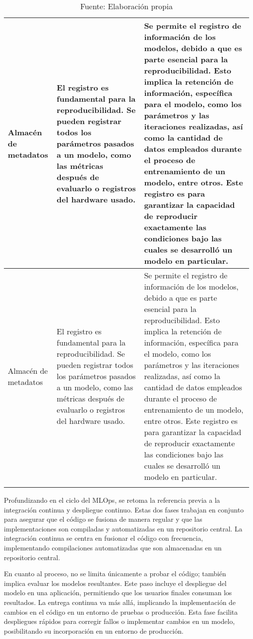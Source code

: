 \begin{longtable}{|p{3cm}|p{5cm}|p{6cm}|}
        \hline
        Almacén de metadatos & El registro es fundamental para la reproducibilidad. Se pueden registrar todos los parámetros pasados a un modelo, como las métricas después de evaluarlo o registros del hardware usado. & Se permite el registro de información de los modelos, debido a que es parte esencial para la reproducibilidad. Esto implica la retención de información, específica para el modelo, como los parámetros y las iteraciones realizadas, así como la cantidad de datos empleados durante el proceso de entrenamiento de un modelo, entre otros. Este registro es para garantizar la capacidad de reproducir exactamente las condiciones bajo las cuales se desarrolló un modelo en particular. \\
        \hline
        Almacén de metadatos & El registro es fundamental para la reproducibilidad. Se pueden registrar todos los parámetros pasados a un modelo, como las métricas después de evaluarlo o registros del hardware usado. & Se permite el registro de información de los modelos, debido a que es parte esencial para la reproducibilidad. Esto implica la retención de información, específica para el modelo, como los parámetros y las iteraciones realizadas, así como la cantidad de datos empleados durante el proceso de entrenamiento de un modelo, entre otros. Este registro es para garantizar la capacidad de reproducir exactamente las condiciones bajo las cuales se desarrolló un modelo en particular. \\
    \hline
    \caption*{\footnotesize Fuente: Elaboración propia}
    \label{tab:tabCicloMlops}
\end{longtable}

Profundizando en el ciclo del MLOps, se retoma la referencia previa a la integración continua y despliegue continuo. Estas dos fases trabajan en conjunto para asegurar que el código se fusiona de manera regular y que las implementaciones son compiladas y automatizadas en un repositorio central. La integración continua se centra en fusionar el código con frecuencia, implementando compilaciones automatizadas que son almacenadas en un repositorio central.

\newpage

En cuanto al proceso, no se limita únicamente a probar el código; también implica evaluar los modelos resultantes. Este paso incluye el despliegue del modelo en una aplicación, permitiendo que los usuarios finales consuman los resultados. La entrega continua va más allá, implicando la implementación de cambios en el código en un entorno de pruebas o producción. Esta fase facilita despliegues rápidos para corregir fallos o implementar cambios en un modelo, posibilitando su incorporación en un entorno de producción.

